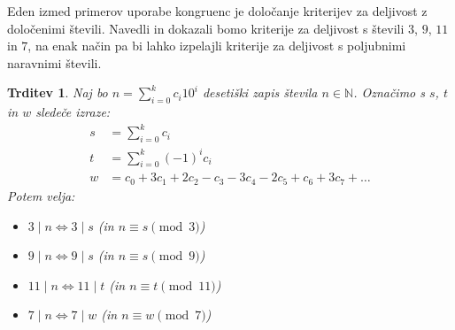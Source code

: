 \documentclass[12pt, a4paper]{article}
\newtheorem{trd}{Trditev}
\begin{document}
Eden izmed primerov uporabe kongruenc je določanje kriterijev za deljivost z določenimi števili. Navedli in dokazali bomo kriterije za deljivost s števili $3$, $9$, $11$ in $7$, na enak način pa bi lahko izpelajli kriterije za deljivost s poljubnimi naravnimi števili.

\begin{trd}
Naj bo $n=\sum_{i=0}^{k} c_{i}10^{i}$ desetiški zapis števila $n\in \mathbb{N}$. Označimo s $s$, $t$ in $w$ sledeče izraze:
\begin{align*}
s&=\sum_{i=0}^{k}c_{i} \\
t&=\sum_{i=0}^{k}(-1)^{i}c_{i} \\
w&=c_{0}+3c_{1}+2c_{2}-c_{3}-3c_{4}-2c_{5}+c_{6}+3c_{7}+\ldots
\end{align*}
Potem velja:
\begin{itemize}
\item[$(i)$] $3\mid n \iff 3\mid s$ (in $n\equiv s \pmod 3$)
\item[$(ii)$] $9\mid n \iff 9\mid s$ (in $n\equiv s \pmod 9$)
\item[$(iii)$] $11\mid n \iff 11\mid t$ (in $n\equiv t \pmod{11}$)
\item[$(iv)$] $7\mid n \iff 7\mid w$ (in $n\equiv w \pmod 7$)
\end{itemize}
\end{trd}
\end{document}
